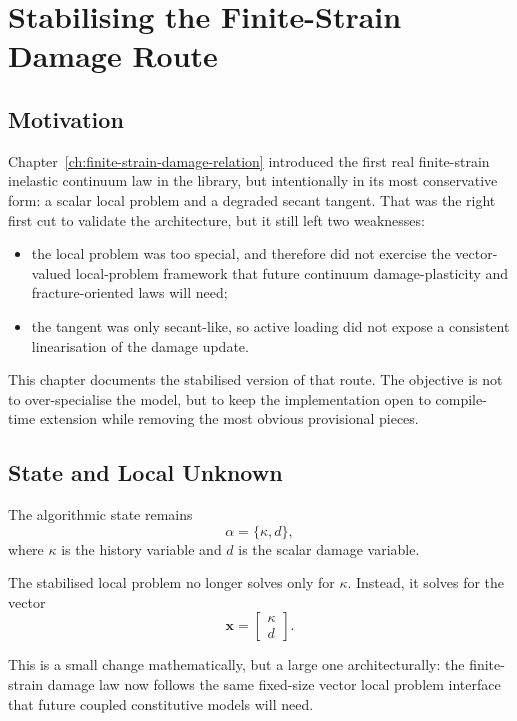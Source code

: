 \chapter{Stabilising the Finite-Strain Damage Route}
\label{ch:finite-strain-damage-stabilization}

\section{Motivation}

Chapter~\ref{ch:finite-strain-damage-relation} introduced the first real
finite-strain inelastic continuum law in the library, but intentionally in its
most conservative form: a scalar local problem and a degraded secant tangent.
That was the right first cut to validate the architecture, but it still left
two weaknesses:
\begin{itemize}
  \item the local problem was too special, and therefore did not exercise the
        vector-valued local-problem framework that future continuum
        damage-plasticity and fracture-oriented laws will need;
  \item the tangent was only secant-like, so active loading did not expose a
        consistent linearisation of the damage update.
\end{itemize}

This chapter documents the stabilised version of that route.  The objective is
not to over-specialise the model, but to keep the implementation open to
compile-time extension while removing the most obvious provisional pieces.

\section{State and Local Unknown}

The algorithmic state remains
\[
  \alpha = \{\kappa, d\},
\]
where $\kappa$ is the history variable and $d$ is the scalar damage variable.

The stabilised local problem no longer solves only for $\kappa$.  Instead, it
solves for the vector
\[
  \mathbf{x} =
  \begin{bmatrix}
    \kappa \\ d
  \end{bmatrix}.
\]

This is a small change mathematically, but a large one architecturally:
the finite-strain damage law now follows the same fixed-size vector local
problem interface that future coupled constitutive models will need.

